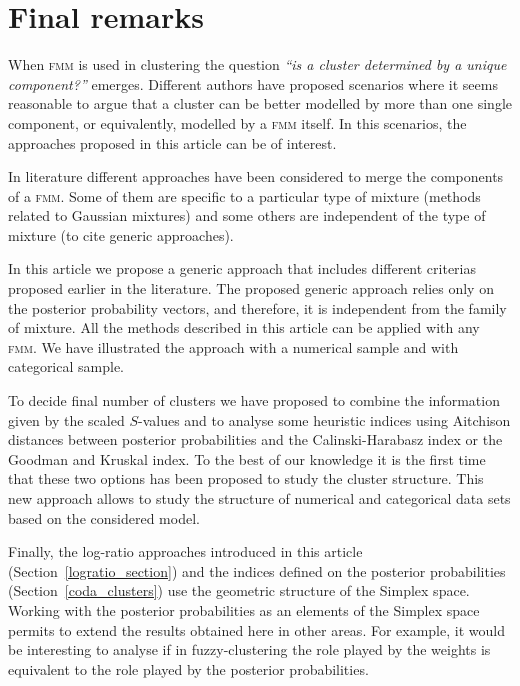 \documentclass[submit]{smj}
\theoremstyle{definition}
\newcommand{\fmm}{\textsc{fmm}\xspace}
\begin{document}
\section{Final remarks}\label{remarks}

 When \fmm is used in clustering the question \textit{``is a cluster determined by a unique component?''} emerges. Different authors have proposed scenarios where it seems reasonable to argue that a cluster can be better modelled by more than one single component, or equivalently, modelled by a \fmm itself. In this scenarios, the approaches proposed in this article can be of interest.

In literature different approaches have been considered to merge the components of a \fmm. Some of them are specific to a particular type of mixture (methods related to Gaussian mixtures) and some others are independent of the type of mixture (to cite generic approaches). 

In this article we propose a generic approach that includes different criterias proposed earlier in the literature. The proposed generic approach relies only on the posterior probability vectors, and therefore, it is independent from the family of mixture. All the methods described in this article can be applied with any \fmm. We have illustrated the approach with a numerical sample and with categorical sample. 

To decide final number of clusters we have proposed to combine the information given by the scaled $S$-values and to analyse some heuristic indices using Aitchison distances between posterior probabilities and  the Calinski-Harabasz index or  the Goodman and Kruskal index. To the best of our knowledge it is the first time that these two options has been proposed to study the cluster structure. This new approach allows to study the structure of numerical and categorical data sets based on the considered model.

Finally, the log-ratio approaches introduced in this article (Section~\ref{logratio_section}) and the indices defined on the posterior probabilities (Section~\ref{coda_clusters}) use the geometric structure of the Simplex space. Working with the posterior probabilities as an elements of the Simplex space permits to extend the results obtained here in other areas. For example, it would be interesting to analyse if in fuzzy-clustering the role played by the weights is equivalent to the role played by the posterior probabilities. 
\end{document}
